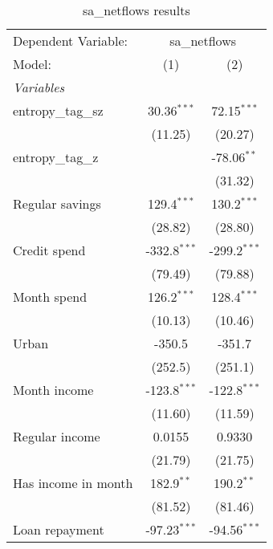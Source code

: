 
\begin{table}[htbp]
   \centering
   \footnotesize
   \begin{threeparttable}[b]
      \caption{\label{tab:reg_sa_netflows_full.tex} sa\_netflows results}
      \begin{tabular}{lcc}
         \tabularnewline \midrule \midrule
         Dependent Variable: & \multicolumn{2}{c}{sa\_netflows}\\
         Model:              & (1)            & (2)\\  
         \midrule
         \emph{Variables}\\
         entropy\_tag\_sz    & 30.36$^{***}$  & 72.15$^{***}$\\   
                             & (11.25)        & (20.27)\\   
         entropy\_tag\_z     &                & -78.06$^{**}$\\   
                             &                & (31.32)\\   
         Regular savings     & 129.4$^{***}$  & 130.2$^{***}$\\   
                             & (28.82)        & (28.80)\\   
         Credit spend        & -332.8$^{***}$ & -299.2$^{***}$\\   
                             & (79.49)        & (79.88)\\   
         Month spend         & 126.2$^{***}$  & 128.4$^{***}$\\   
                             & (10.13)        & (10.46)\\   
         Urban               & -350.5         & -351.7\\   
                             & (252.5)        & (251.1)\\   
         Month income        & -123.8$^{***}$ & -122.8$^{***}$\\   
                             & (11.60)        & (11.59)\\   
         Regular income      & 0.0155         & 0.9330\\   
                             & (21.79)        & (21.75)\\   
         Has income in month & 182.9$^{**}$   & 190.2$^{**}$\\   
                             & (81.52)        & (81.46)\\   
         Loan repayment      & -97.23$^{***}$ & -94.56$^{***}$\\   

\end{tabular}
\end{threeparttable}
\end{table}
